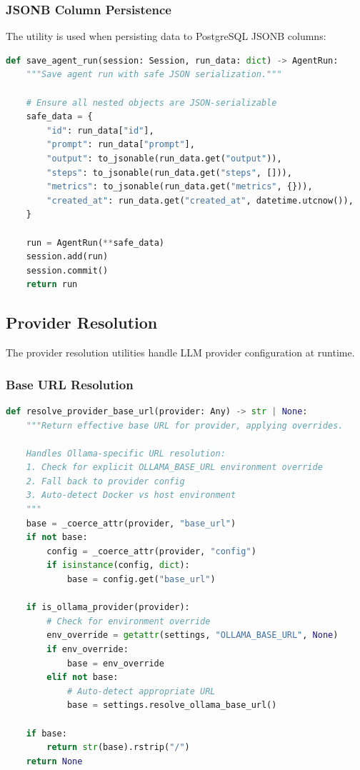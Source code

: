 \subsubsection{JSONB Column Persistence}

The utility is used when persisting data to PostgreSQL JSONB columns:

\begin{lstlisting}[language=Python, caption={Safe JSONB persistence pattern.}]
def save_agent_run(session: Session, run_data: dict) -> AgentRun:
    """Save agent run with safe JSON serialization."""
    
    # Ensure all nested objects are JSON-serializable
    safe_data = {
        "id": run_data["id"],
        "prompt": run_data["prompt"],
        "output": to_jsonable(run_data.get("output")),
        "steps": to_jsonable(run_data.get("steps", [])),
        "metrics": to_jsonable(run_data.get("metrics", {})),
        "created_at": run_data.get("created_at", datetime.utcnow()),
    }
    
    run = AgentRun(**safe_data)
    session.add(run)
    session.commit()
    return run
\end{lstlisting}

\subsection{Provider Resolution}
\label{subsec:provider-resolution}

The provider resolution utilities handle LLM provider configuration at runtime.

\subsubsection{Base URL Resolution}

\begin{lstlisting}[language=Python, caption={Provider URL resolution from \texttt{src/utils/provider\_resolver.py}.}]
def resolve_provider_base_url(provider: Any) -> str | None:
    """Return effective base URL for provider, applying overrides.
    
    Handles Ollama-specific URL resolution:
    1. Check for explicit OLLAMA_BASE_URL environment override
    2. Fall back to provider config
    3. Auto-detect Docker vs host environment
    """
    base = _coerce_attr(provider, "base_url")
    if not base:
        config = _coerce_attr(provider, "config")
        if isinstance(config, dict):
            base = config.get("base_url")
    
    if is_ollama_provider(provider):
        # Check for environment override
        env_override = getattr(settings, "OLLAMA_BASE_URL", None)
        if env_override:
            base = env_override
        elif not base:
            # Auto-detect appropriate URL
            base = settings.resolve_ollama_base_url()
    
    if base:
        return str(base).rstrip("/")
    return None
\end{lstlisting}

